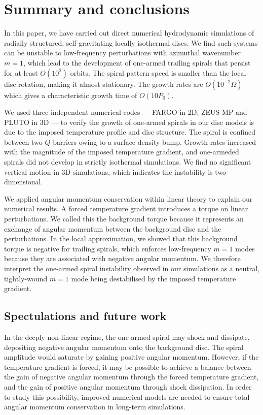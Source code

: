\section{Summary and conclusions}\label{summary}
In this paper, we have carried out direct numerical hydrodynamic
simulations of radially structured, self-gravitating locally
isothermal discs.     
We find such systems can be unstable to low-frequency perturbations
with azimuthal wavenumber $m=1$, which lead to the development of one-armed 
trailing spirals that persist for at least $O(10^2)$ orbits. The 
spiral pattern speed is smaller than the local disc rotation, making
it almost stationary. The growth rates are $O(10^{-2}\Omega)$ which
gives a characteristic growth time of $O(10P_0)$. 

We used three independent numerical codes --- FARGO in 2D, ZEUS-MP and
PLUTO in 3D --- to verify the growth of  
one-armed spirals in our disc models is due to the imposed temperature
profile and disc structure. The spiral is confined between two
$Q$-barriers owing to a surface density bump. Growth rates increased
with the magnitude of the imposed temperature gradient, and one-armeded
spirals did not develop in strictly isothermal simulations.  
We find no significant vertical 
motion in 3D simulations, which indicates the instability is
two-dimensional. 

We applied angular momentum conservation within linear theory to
explain our numerical results. A  
forced temperature gradient introduces a torque on linear 
perturbations. We called this the background torque because it
represents an exchange of angular momentum between the background disc
and the perturbations. In the local approximation, we showed that this
background torque is negative for trailing spirals, which enforces  
low-frequency $m=1$ modes because they are associated with negative
angular momentum. We therefore interpret the one-armed spiral instability
observed in our simulations as a neutral, tightly-wound $m=1$ mode
being destabilised by the imposed temperature gradient.  

\subsection{Spectulations and future work}
In the deeply non-linear regime, the one-armed spiral may 
shock and dissipate, depositing negative angular momentum onto
the background disc. The spiral amplitude would saturate by gaining
positive angular momentum. However, if the temperature gradient is
forced, it may be possible to achieve a balance between the gain of negative
angular momentum through the forced temperature gradient, and the gain
of positive angular momentum through shock dissipation. In order to
study this possibility, improved numerical models are needed to ensure 
total angular momentum conservation in long-term simulations.  


